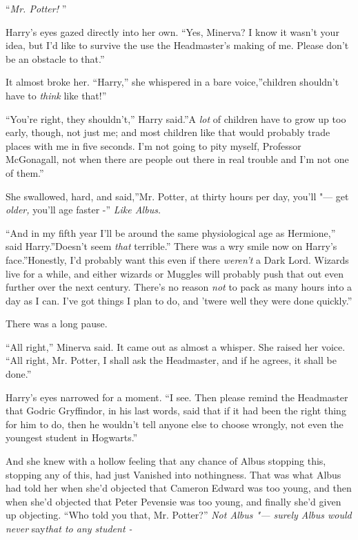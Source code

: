 ``\emph{Mr. Potter!} ''

Harry's eyes gazed directly into her own. ``Yes, Minerva? I know it
wasn't your idea, but I'd like to survive the use the Headmaster's
making of me. Please don't be an obstacle to that.''

It almost broke her. ``Harry,'' she whispered in a bare voice,''children
shouldn't have to \emph{think} like that!''

``You're right, they shouldn't,'' Harry said.''A \emph{lot} of children
have to grow up too early, though, not just me; and most children like
that would probably trade places with me in five seconds. I'm not going
to pity myself, Professor McGonagall, not when there are people out
there in real trouble and I'm not one of them.''

She swallowed, hard, and said,''Mr. Potter, at thirty hours per day,
you'll "--- get \emph{older,} you'll age faster -'' \emph{Like Albus.}

``And in my fifth year I'll be around the same physiological age as
Hermione,'' said Harry.''Doesn't seem \emph{that} terrible.'' There was
a wry smile now on Harry's face.''Honestly, I'd probably want this even
if there \emph{weren't} a Dark Lord. Wizards live for a while, and
either wizards or Muggles will probably push that out even further over
the next century. There's no reason \emph{not} to pack as many hours
into a day as I can. I've got things I plan to do, and 'twere well they
were done quickly.''

There was a long pause.

``All right,'' Minerva said. It came out as almost a whisper. She raised
her voice. ``All right, Mr. Potter, I shall ask the Headmaster, and if
he agrees, it shall be done.''

Harry's eyes narrowed for a moment. ``I see. Then please remind the
Headmaster that Godric Gryffindor, in his last words, said that if it
had been the right thing for him to do, then he wouldn't tell anyone
else to choose wrongly, not even the youngest student in Hogwarts.''

And she knew with a hollow feeling that any chance of Albus stopping
this, stopping any of this, had just Vanished into nothingness. That was
what Albus had told her when she'd objected that Cameron Edward was too
young, and then when she'd objected that Peter Pevensie was too young,
and finally she'd given up objecting. ``Who told you that, Mr. Potter?''
\emph{Not Albus "--- surely Albus would never} say\emph{that to any student
-}

